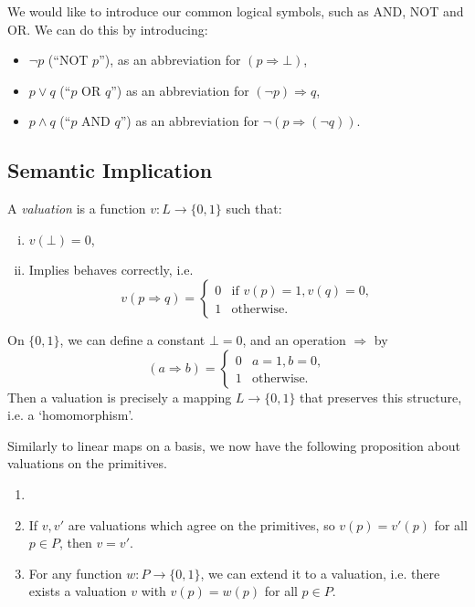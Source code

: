 \documentclass[12pt]{article}
\begin{document}
We would like to introduce our common logical symbols, such as AND, NOT and OR. We can do this by introducing:
\begin{itemize}
	\item $\neg p$ (``NOT $p$''), as an abbreviation for $(p \Rightarrow \bot)$,
	\item $p \vee q$ (``$p$ OR $q$'') as an abbreviation for $(\neg p) \Rightarrow q$,
	\item $p \wedge q$ (``$p$ AND $q$'') as an abbreviation for $\neg (p \Rightarrow (\neg q))$.
\end{itemize}

\subsection{Semantic Implication}
\label{sub:semantic_implication}

A \emph{valuation} is a function $v : L \to \{0, 1\}$ such that:
\begin{enumerate}[(i)]
	\item $v(\bot) = 0$,
	\item Implies behaves correctly, i.e.
		\[
		v(p \Rightarrow q) =
		\begin{cases}
			0 & \text{if } v(p) =  1, v(q) = 0,\\
			1 & \text{otherwise}.
		\end{cases}
		\]
\end{enumerate}

\begin{remark}
	On $\{0, 1\}$, we can define a constant $\bot = 0$, and an operation $\Rightarrow$ by
	\[
		(a \Rightarrow b) =
		\begin{cases}
			0 & a = 1, b = 0,\\
			1 & \text{otherwise}.
		\end{cases}
	\]
	Then a valuation is precisely a mapping $L \to \{0, 1\}$ that preserves this structure, i.e. a `homomorphism'.
\end{remark}

Similarly to linear maps on a basis, we now have the following proposition about valuations on the primitives.

\begin{proposition}
	\begin{enumerate}[\normalfont(i)]
		\item[]
		\item If $v, v'$ are valuations which agree on the primitives, so $v(p) = v'(p)$ for all $p \in P$, then $v = v'$.
		\item For any function $w : P \to \{0, 1\}$, we can extend it to a valuation, i.e. there exists a valuation $v$ with $v(p) = w(p)$ for all $p \in P$.
	\end{enumerate}
\end{proposition}
\end{document}
